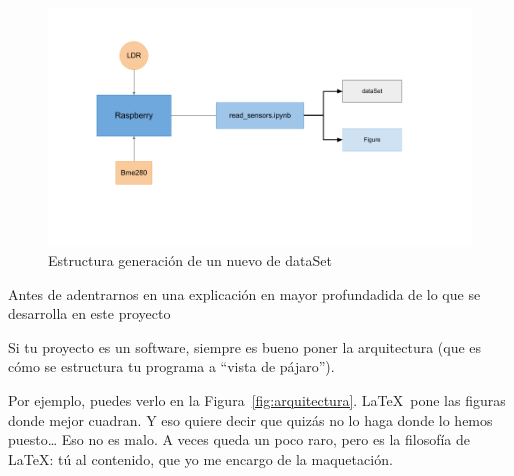 \documentclass[a4paper, 12pt]{book}
\begin{document}
\begin{figure}[h!]
  \centering
  \includegraphics[width=14cm, keepaspectratio]{img/esquema_sensores.png}
  \caption{Estructura generación de un nuevo de dataSet}\label{fig:esquema_sensores}
\end{figure}

Antes de adentrarnos en una explicación en mayor profundadida de lo que se desarrolla en este proyecto

Si tu proyecto es un software, siempre es bueno poner la arquitectura (que es cómo se estructura tu programa a ``vista de pájaro'').

Por ejemplo, puedes verlo en la Figura~\ref{fig:arquitectura}.
\LaTeX \ pone las figuras donde mejor cuadran. 
Y eso quiere decir que quizás no lo haga donde lo hemos puesto\ldots
Eso no es malo.
A veces queda un poco raro, pero es la filosofía de \LaTeX: tú al contenido, que yo me encargo de la maquetación.
\end{document}
